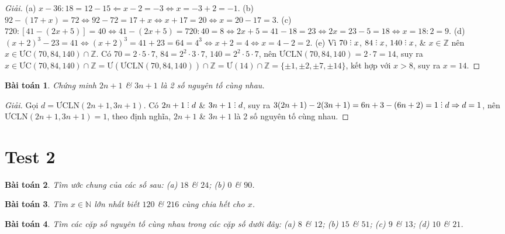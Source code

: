 \documentclass[11pt]{article}
\numberwithin{equation}{section}
\newtheorem{baitoan}{Bài toán}[section]
\DeclareRobustCommand{\divby}{%
	\mathrel{\vbox{\baselineskip.65ex\lineskiplimit0pt\hbox{.}\hbox{.}\hbox{.}}}%
}
\begin{document}
\begin{proof}[Giải]
	(a) $x - 36:18 = 12 - 15\Leftarrow x - 2 = -3\Leftrightarrow x = -3 + 2 = -1$. (b) $92 - (17 + x) = 72\Leftrightarrow 92 - 72 = 17 + x\Leftrightarrow x + 17 = 20\Leftrightarrow x = 20 - 17 = 3$. (c) $720:[41 - (2x + 5)] = 40\Leftrightarrow 41 - (2x + 5) = 720:40 = 8\Leftrightarrow 2x + 5 = 41 - 18 = 23\Leftrightarrow 2x = 23 - 5 = 18\Leftrightarrow x = 18:2 = 9$. (d) $(x + 2)^3 - 23 = 41\Leftrightarrow(x + 2)^3 = 41 + 23 = 64 = 4^3\Leftrightarrow x + 2 = 4\Leftrightarrow x = 4 - 2 = 2$. (e) Vì $70\divby x$, $84\divby x$, $140\divby x$, \& $x\in\mathbb{Z}$ nên $x\in\mbox{ƯC}(70,84,140)\cap\mathbb{Z}$. Có $70 = 2\cdot5\cdot7$, $84 = 2^2\cdot3\cdot7$, $140 = 2^2\cdot5\cdot7$, nên $\mbox{ƯCLN}(70,84,140) = 2\cdot7 = 14$, suy ra $x\in\mbox{ƯC}(70,84,140)\cap\mathbb{Z} = \mbox{Ư}(\mbox{ƯCLN}(70,84,140))\cap\mathbb{Z} = \mbox{Ư}(14)\cap\mathbb{Z} = \{\pm1,\pm2,\pm7,\pm14\}$, kết hợp với $x > 8$, suy ra $x = 14$.
\end{proof}

\begin{baitoan}
	Chứng minh $2n + 1$ \& $3n + 1$ là 2 số nguyên tố cùng nhau.
\end{baitoan}

\begin{proof}[Giải]
	Gọi $d = \mbox{ƯCLN}(2n + 1,3n + 1)$. Có $2n + 1\divby d$ \& $3n + 1\divby d$, suy ra $3(2n + 1) - 2(3n + 1) = 6n + 3 - (6n + 2) = 1\divby d\Rightarrow d = 1$, nên $\mbox{ƯCLN}(2n + 1,3n + 1) = 1$, theo định nghĩa, $2n + 1$ \& $3n + 1$ là 2 số nguyên tố cùng nhau.
\end{proof}


\section{Test 2}

\begin{baitoan}
	Tìm ước chung của các số sau: (a) $18$ \& $24$; (b) $0$ \& $90$.
\end{baitoan}

\begin{baitoan}
	Tìm $x\in\mathbb{N}$ lớn nhất biết $120$ \& $216$ cùng chia hết cho $x$.
\end{baitoan}

\begin{baitoan}
	Tìm các cặp số nguyên tố cùng nhau trong các cặp số dưới đây: (a) $8$ \& $12$; (b) $15$ \& $51$; (c) $9$ \& $13$; (d) $10$ \& $21$.
\end{baitoan}
\end{document}
